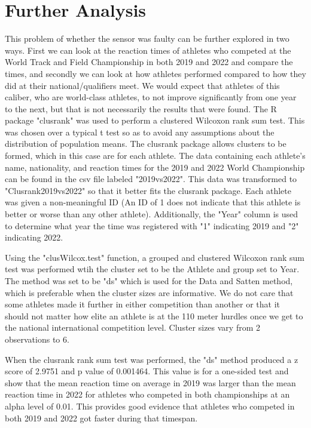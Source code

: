 \documentclass[12pt, letterpaper, titlepage]{article}
\begin{document}
\section{Further Analysis}
This problem of whether the sensor was faulty can be further explored in
two ways. First we can look at the reaction times of athletes who competed at the
World Track and Field Championship in both 2019 and 2022 and compare the times,
and secondly we can look at how athletes performed compared to how they did at
their national/qualifiers meet.  We would expect that athletes of this caliber,
who are world-class athletes, to not improve significantly from one year to the
next, but that is not necessarily the results that were found.  The R package
"clusrank" was used to perform a clustered Wilcoxon rank sum test.  This was
chosen over a typical t test so as to avoid any assumptions about the distribution
of population means.  The clusrank package allows clusters to be formed, which
in this case are for each athlete.  The data containing each athlete's name,
nationality, and reaction times for the 2019 and 2022 World Championship can be
found in the csv file labeled "2019vs2022".  This data was transformed to "Clusrank2019vs2022"
so that it better fits the clusrank package.  Each athlete was given a non-meaningful
ID (An ID of 1 does not indicate that this athlete is better or worse than any
other athlete).  Additionally, the "Year" column is used to determine what year
the time was registered with "1" indicating 2019 and "2" indicating 2022.

Using the "clusWilcox.test" function, a grouped and clustered Wilcoxon rank sum
test was performed wtih the cluster set to be the Athlete and group set to Year.
The method was set to be "ds" which is used for the Data and Satten method, which
is preferable when the cluster sizes are informative.  We do not care that some
athletes made it further in either competition than another or that it should
not matter how elite an athlete is at the 110 meter hurdles once we get to the
national international competition level.  Cluster sizes vary from 2 observations
to 6.

When the clusrank rank sum test was performed, the "ds" method produced a z score of
2.9751 and p value of 0.001464.  This value is for a one-sided test and show that
the mean reaction time on average in 2019 was larger than the mean reaction time
in 2022 for athletes who competed in both championships at an alpha level of 0.01.
This provides good evidence that athletes who competed in both 2019 and 2022 got
faster during that timespan.
\end{document}
